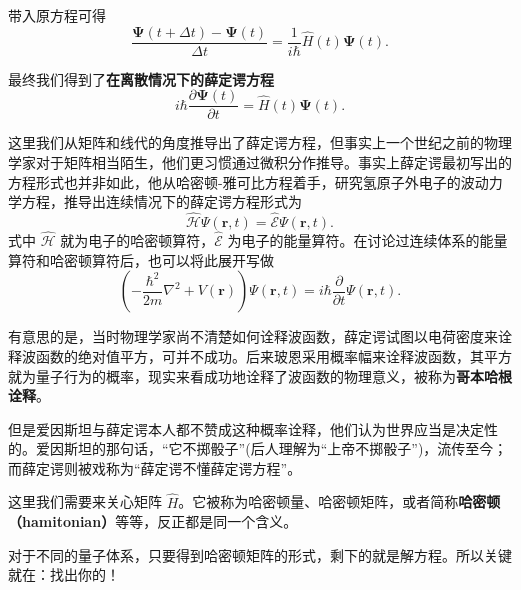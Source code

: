 \documentclass[12pt,a4paper,oneside]{book}
\begin{document}
带入原方程可得
\begin{equation}
    \frac{\boldsymbol{\Psi}(t+\Delta t)-\boldsymbol{\Psi}(t)}{\Delta t}=\frac{1}{i\hbar}\hat{H}(t)\boldsymbol{\Psi}(t).
\end{equation}

最终我们得到了\textbf{在离散情况下的薛定谔方程}
\begin{equation}
    i\hbar\frac{\partial\boldsymbol{\Psi}(t)}{\partial t}=\hat{H}(t)\boldsymbol{\Psi}(t).
\end{equation}

\begin{tcolorbox}[before upper={\parindent20pt},title=\textit{关于薛定谔与薛定谔方程},breakable,fontupper=\footnotesize,colframe=blue!40!white,colback=blue!5!white]
    这里我们从矩阵和线代的角度推导出了薛定谔方程，但事实上一个世纪之前的物理学家对于矩阵相当陌生，他们更习惯通过微积分作推导。事实上薛定谔最初写出的方程形式也并非如此，他从哈密顿-雅可比方程着手，研究氢原子外电子的波动力学方程，推导出连续情况下的薛定谔方程形式为
    \begin{equation*}
        \hat{\mathscr{H}}\Psi(\boldsymbol{r},t)=\hat{\mathscr{E}}\Psi(\boldsymbol{r},t).
    \end{equation*}
    式中 $\hat{\mathscr{H}}$ 就为电子的哈密顿算符，$\hat{\mathscr{E}}$ 为电子的能量算符。在讨论过连续体系的能量算符和哈密顿算符后，也可以将此展开写做
    \begin{equation*}
        (-\frac{\hbar^2}{2m}\nabla^2 + V(\boldsymbol{r}))\Psi(\boldsymbol{r},t)=i\hbar \frac{\partial}{\partial t}\Psi(\boldsymbol{r},t).
    \end{equation*}

    有意思的是，当时物理学家尚不清楚如何诠释波函数，薛定谔试图以电荷密度来诠释波函数的绝对值平方，可并不成功。后来玻恩采用概率幅来诠释波函数，其平方就为量子行为的概率，现实来看成功地诠释了波函数的物理意义，被称为\textbf{哥本哈根诠释}。
    
    但是爱因斯坦与薛定谔本人都不赞成这种概率诠释，他们认为世界应当是决定性的。爱因斯坦的那句话，“它不掷骰子”(后人理解为“上帝不掷骰子”)，流传至今；而薛定谔则被戏称为“薛定谔不懂薛定谔方程”。

\end{tcolorbox}

这里我们需要来关心矩阵 $\hat{H}$。它被称为哈密顿量、哈密顿矩阵，或者简称\textbf{哈密顿（hamitonian）}等等，反正都是同一个含义。

对于不同的量子体系，只要得到哈密顿矩阵的形式，剩下的就是解方程。所以关键就在：找出你的！
\end{document}
